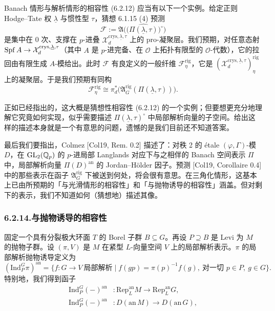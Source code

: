 Banach 情形与解析情形的相容性 (6.2.12) 应当有以下一个实例。给定正则 Hodge--Tate 权 $\underline\lambda$ 与惯性型 $\tau$，猜想 6.1.15 (4) 预测
\[
\mathcal F:=\mathfrak A\bigl(\bigl(\widehat{\Pi(\underline\lambda,\tau)}\bigr)^{\circ}\bigr)
\]
是集中在 0 次、支撑在 $p$-进叠 $\mathcal X_d^{\mathrm{crys},\underline\lambda,\tau}$ 上的 pro-凝聚层。我们预期，对任意态射 $\operatorname{Spf} A\to\mathcal X_d^{\mathrm{crys},\underline\lambda,\tau}$（其中 $A$ 是 $p$-进完备、在 $\mathcal O$ 上拓扑有限型的 $\mathcal O$-代数），它的拉回由有限生成 $A$-模给出。此时 $\mathcal F$ 有良定义的一般纤维 $\mathcal F^{\mathrm{rig}}_\eta$，它是 $(\mathcal X_d^{\mathrm{crys},\underline\lambda,\tau})^{\mathrm{rig}}_\eta$ 上的凝聚层。于是我们预期有同构
\begin{equation}\tag{6.2.13}\label{eq:a4-6-2-13}
\mathcal F^{\mathrm{rig}}_\eta\cong\pi_d^*\bigl(\mathfrak A^{\mathrm{rig}}_G(\Pi(\underline\lambda,\tau))\bigr).
\end{equation}

正如已经指出的，这大概是猜想性相容性 (6.2.12) 的一个实例；但要想更充分地理解它究竟如何实现，似乎需要描述 $\Pi(\underline\lambda,\tau)^\circ$ 中局部解析向量的子空间。给出这样的描述本身就是一个有意思的问题，遗憾的是我们目前还不知道答案。

最后我们要指出，Colmez [Col19, Rem. 0.2] 描述了：对秩 2 的 étale $(\varphi,\Gamma)$-模 $D$，在 $\mathrm{GL}_2(\mathbb{Q}_p)$ 的 $p$-进局部 Langlands 对应下与之相伴的 Banach 空间表示 $\Pi$ 中，局部解析向量 $\Pi(D)^{\mathrm{an}}$ 的 Jordan--Hölder 因子。预测 [Col19, Corollaire 0.4] 中的那些表示在函子 $\mathfrak A^{\mathrm{rig}}_G$ 下被送到何处，将会很有意思。在三角化情形，这基本上已由所预期的「与光滑情形的相容性」和「与抛物诱导的相容性」涵盖。但对剩下的表示，我们不知道如何（猜想地）描述其像。

\subsubsection*{6.2.14.\quad 与抛物诱导的相容性}

固定一个具有分裂极大环面 $T$ 的 Borel 子群 $B\subseteq G$。再设 $P\supseteq B$ 是 Levi 为 $M$ 的抛物子群。设 $(\pi,V)$ 是 $M$ 在紧型 $L$-向量空间 $V$ 上的局部解析表示。$\pi$ 的局部解析抛物诱导定义为
\[
(\mathrm{Ind}^G_P\pi)^{\mathrm{an}}
=\{f:G\to V\ \text{局部解析}\mid f(gp)=\pi(p)^{-1}f(g),\ 
\text{对一切 }p\in P,\ g\in G\}.
\]
特别地，我们得到函子
\begin{align*}
\mathrm{Ind}^G_P(-)^{\mathrm{an}}&:\mathrm{Rep}^{\mathrm{an}}_L M\longrightarrow\mathrm{Rep}^{\mathrm{an}}_L G,\\
\mathrm{Ind}^G_P(-)^{\mathrm{an}}&:D(\mathrm{an}\,M)\longrightarrow D(\mathrm{an}\,G),
\end{align*}

